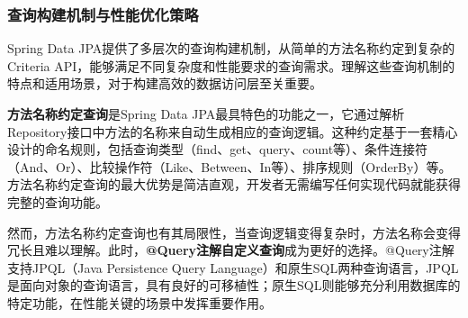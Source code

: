 \subsubsection{查询构建机制与性能优化策略}\label{ux67e5ux8be2ux6784ux5efaux673aux5236ux4e0eux6027ux80fdux4f18ux5316ux7b56ux7565}

Spring Data JPA提供了多层次的查询构建机制，从简单的方法名称约定到复杂的Criteria API，能够满足不同复杂度和性能要求的查询需求。理解这些查询机制的特点和适用场景，对于构建高效的数据访问层至关重要。

\textbf{方法名称约定查询}是Spring Data JPA最具特色的功能之一，它通过解析Repository接口中方法的名称来自动生成相应的查询逻辑。这种约定基于一套精心设计的命名规则，包括查询类型（find、get、query、count等）、条件连接符（And、Or）、比较操作符（Like、Between、In等）、排序规则（OrderBy）等。方法名称约定查询的最大优势是简洁直观，开发者无需编写任何实现代码就能获得完整的查询功能。

然而，方法名称约定查询也有其局限性，当查询逻辑变得复杂时，方法名称会变得冗长且难以理解。此时，\textbf{@Query注解自定义查询}成为更好的选择。@Query注解支持JPQL（Java Persistence Query Language）和原生SQL两种查询语言，JPQL是面向对象的查询语言，具有良好的可移植性；原生SQL则能够充分利用数据库的特定功能，在性能关键的场景中发挥重要作用。

